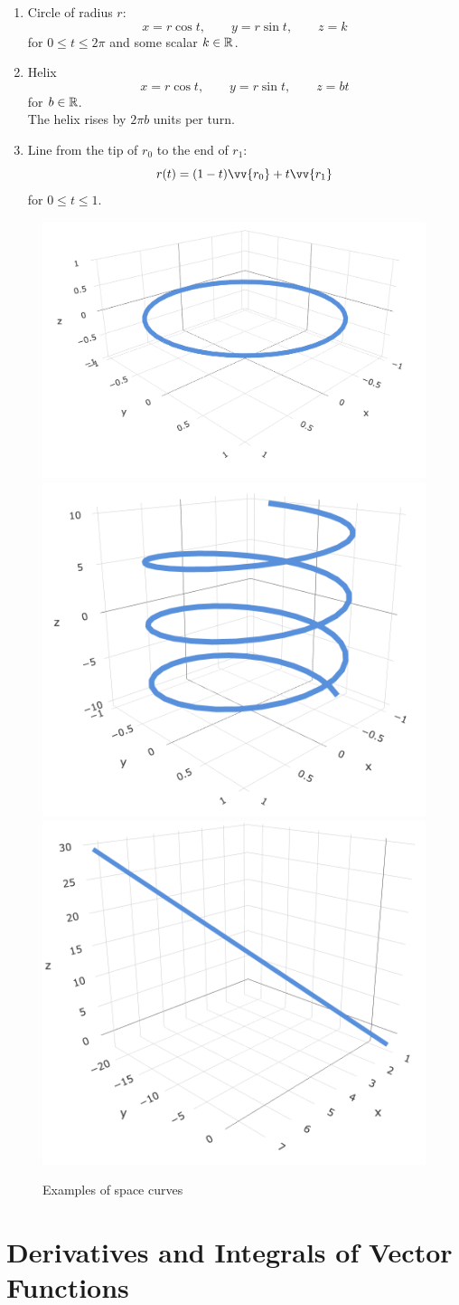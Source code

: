 \begin{example}
\begin{enumerate}
    \item Circle of radius $r$:
    $$
    x=r\cos t, \qquad y=r\sin t, \qquad z=k
    $$
    for $0 \leq t \leq 2\pi$ and some scalar $k \in {\mathbb R}$.
    
    \item Helix
    $$
    x=r\cos t, \qquad y=r\sin t, \qquad z=bt
    $$
    for $b \in {\mathbb R}$. \\
    The helix rises by $2\pi b$ units per turn.
    
    \item Line from the tip of $r_0$ to the end of $r_1$:
    $$
    r(t) = (1-t)\vv{r_0} + t\vv{r_1}
    $$
    for $0 \leq t \leq 1$.
\end{enumerate}

\begin{figure}[ht]
    \centering
    \includegraphics[width=0.3\linewidth]{figures/space-curve-circ.png}
    \includegraphics[width=0.3\linewidth]{figures/space-curve-helix.png}
    \includegraphics[width=0.3\linewidth]{figures/space-curve-line.png}
    \caption{Examples of space curves}
    \label{fig:space_curves}
\end{figure}
\end{example}

\section{Derivatives and Integrals of Vector Functions}

